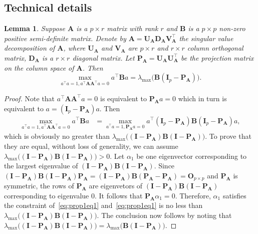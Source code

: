\documentclass[12pt]{article} %
\newcommand{\bA}{\mathbf{A}}
\newcommand{\bB}{\mathbf{B}}
\newcommand{\bP}{\mathbf{P}}
\newcommand{\bO}{\mathbf{O}}
\newcommand{\bI}{\mathbf{I}}
\newcommand{\bU}{\mathbf{U}}
\newcommand{\bD}{\mathbf{D}}
\newcommand{\bV}{\mathbf{V}}
\newtheorem{lemma}{Lemma}
\theoremstyle{definition}
\begin{document}
\begin{appendices}
    \section{Technical details}\label{app}
\begin{lemma}\label{optProp}
    Suppose $\bA$ is a $p\times r$ matrix with rank $r$ and $\bB$ is a $p\times p$  non-zero positive semi-definite matrix.
    Denote by $\bA=\bU_\bA \bD_\bA \bV_\bA^\top$ the singular value decomposition of $\bA$, where $\bU_\bA$ and $\bV_\bA$ are $p\times r$ and $r\times r$ column orthogonal matrix, $\bD_\bA$ is a $r\times r$ diagonal matrix.
    Let $\bP_\bA=\bU_\bA \bU_\bA^\top$ be the projection matrix on the column space of $\bA$.
    Then
    \begin{equation}
        \max_{a^\top a=1, a^\top \bA \bA^\top a=0}a^\top \bB a=
        \lambda_{\max}\big(\bB(\bI_p-\bP_\bA)\big).
    \end{equation}
\end{lemma}
\begin{proof}
    Note that $a^\top \bA \bA^\top a=0$ is equivalent to $\bP_\bA a=0$ which in turn is equivalent to $a= (\bI_p-\bP_\bA)a$.
    Then
    \begin{equation}\label{eq:prop1eq1}
        \begin{aligned}
        \max_{a^\top a=1, a^\top \bA \bA^\top a=0}a^\top \bB a
            &=
        \max_{a^\top a=1, \bP_\bA a=0}a^\top(\bI_p-\bP_\bA) \bB (\bI_p-\bP_\bA)a,
        \end{aligned}
    \end{equation}
    which is obviously no greater than $\lambda_{\max}\big((\bI-\bP_\bA)\bB(\bI-\bP_\bA)\big)$.
    To prove that they are equal,  without loss of generality, we can assume $\lambda_{\max}\big((\bI-\bP_\bA)\bB(\bI-\bP_\bA)\big)>0$.
    Let $\alpha_1$ be one eigenvector corresponding to the largest eigenvalue of $(\bI-\bP_\bA)\bB(\bI-\bP_\bA)$.
    Since $(\bI-\bP_\bA)\bB(\bI-\bP_\bA)\bP_\bA=(\bI-\bP_\bA)\bB(\bP_\bA-\bP_\bA)=\bO_{p\times p}$ and $\bP_\bA$ is symmetric, the rows of $\bP_\bA$ are eigenvetors of $(\bI-\bP_\bA)\bB(\bI-\bP_\bA)$ corresponding to eigenvalue $0$.
    It follows that $\bP_\bA\alpha_1=0$.
    Therefore, $\alpha_1$ satisfies the constraint of~\eqref{eq:prop1eq1} and~\eqref{eq:prop1eq1} is no less than $\lambda_{\max}\big((\bI-\bP_\bA)\bB(\bI-\bP_\bA)\big)$.
    The conclusion now follows by noting that $\lambda_{\max}\big((\bI-\bP_\bA)\bB(\bI-\bP_\bA)\big)=\lambda_{\max}\big( \bB(\bI-\bP_\bA)\big)$.
    

\end{proof}
\end{appendices}
\end{document}
